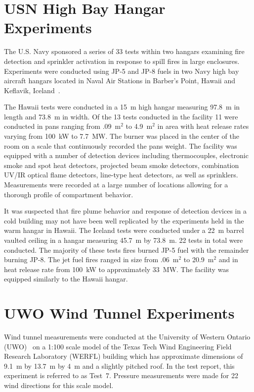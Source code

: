 \section{USN High Bay Hangar Experiments}
\label{USN_High_Bay_Hangar_Description}

The U.S. Navy sponsored a series of 33 tests within two hangars examining fire detection and sprinkler activation in response to spill fires in large enclosures. Experiments were conducted using JP-5 and JP-8 fuels in two Navy high bay aircraft hangars located in Naval Air Stations in Barber's Point, Hawaii and Keflavik, Iceland~\cite{Gott:1}.

The Hawaii tests were conducted in a 15~m high hangar measuring 97.8~m in length and 73.8~m in width. Of the 13 tests conducted in the facility 11 were conducted in pans ranging from .09~m$^2$ to 4.9~m$^2$ in area with heat release rates varying from 100~kW to 7.7~MW. The burner was placed in the center of the room on a scale that continuously recorded the pans weight. The facility was equipped with a number of detection devices including thermocouples, electronic smoke and spot heat detectors, projected beam smoke detectors, combination UV/IR optical flame detectors, line-type heat detectors, as well as sprinklers. Measurements were recorded at a large number of locations allowing for a thorough profile of compartment behavior.

It was suspected that fire plume behavior and response of detection devices in a cold building may not have been well replicated by the experiments held in the warm hangar in Hawaii. The Iceland tests were conducted under a 22~m barrel vaulted ceiling in a hangar measuring 45.7~m by 73.8~m. 22 tests in total were conducted. The majority of these tests fires burned JP-5 fuel with the remainder burning JP-8. The jet fuel fires ranged in size from .06~m$^2$ to 20.9~m$^2$ and in heat release rate from 100~kW to approximately 33~MW. The facility was equipped similarly to the Hawaii hangar.



\section{UWO Wind Tunnel Experiments}
\label{UWO_Wind_Tunnel_Description}

Wind tunnel measurements were conducted at the University of Western Ontario (UWO)~\cite{UWO_Wind_Tunnel_Report} on a 1:100 scale model of the Texas Tech Wind Engineering Field Research Laboratory (WERFL) building which has approximate dimensions of 9.1~m by 13.7~m by 4~m and a slightly pitched roof. In the test report, this experiment is referred to as Test~7. Pressure measurements were made for 22 wind directions for this scale model.

